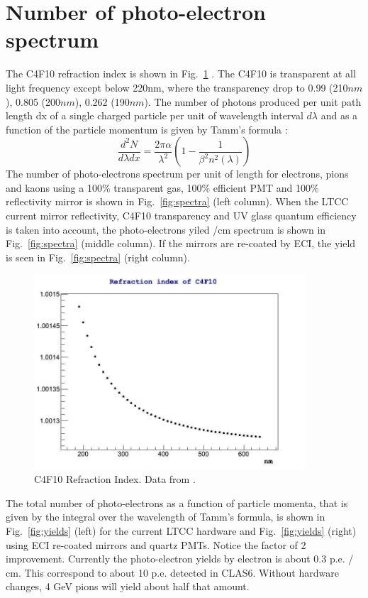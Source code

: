 \documentclass{article}
\begin{document}
\clearpage\newpage
\section{Number of photo-electron spectrum}

The C4F10 refraction index is shown in Fig.~\ref{fig:ri} \cite{bib:c4f10refr}. The C4F10 is transparent at all light frequency except below 220nm,
where the transparency drop to 0.99 (210$nm$), 0.805 (200$nm$), 0.262 (190$nm$).
The number of photons produced per unit path length dx of a single charged particle per unit of wavelength interval $d\lambda$ and as a function of the 
particle momentum is given by Tamm's formula \cite{bib:tamm}: 
$$
\frac{d^2N}{d\lambda dx} = \frac{2\pi\alpha}{\lambda^2}(1 - \frac{1}{\beta^2n^2(\lambda)})
$$
The number of photo-electrons spectrum per unit of length for electrons, pions and kaons using a 100\% transparent gas, 100\% efficient PMT and 
100\% reflectivity mirror is shown in Fig.~\ref{fig:spectra} (left column).
When the LTCC current mirror reflectivity, C4F10 transparency and UV glass quantum
efficiency is taken into account, the photo-electrons yiled /cm spectrum is shown in
 Fig.~\ref{fig:spectra} (middle column). If the mirrors are re-coated by ECI, the yield is seen in  Fig.~\ref{fig:spectra} (right column).
\begin{figure}[ht]
	\centering
	\includegraphics[width=0.9\textwidth]{img/refraction_index.jpg}
	\caption{\scriptsize C4F10 Refraction Index. Data from \cite{bib:c4f10refr}.}
	\label{fig:ri}
\end{figure}

The total number of photo-electrons as a function of particle momenta, that is given by the integral over 
the wavelength of Tamm's formula, is shown in Fig.~\ref{fig:yields} (left) for the current LTCC hardware and 
 Fig.~\ref{fig:yields} (right) using ECI re-coated mirrors and quartz PMTs. Notice the factor of 2 improvement.
 Currently the photo-electron yields by electron is about 0.3 p.e. / cm. This correspond to about 10 p.e. detected in CLAS6.
 Without hardware changes, 4 GeV pions will yield about half that amount.
 
\end{document}
